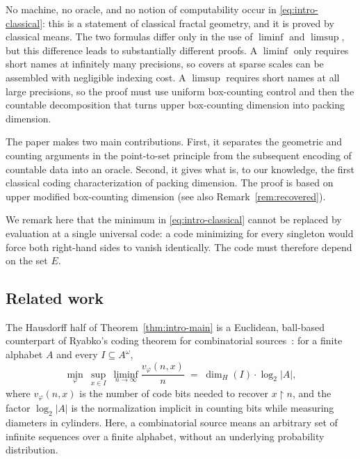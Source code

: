 \documentclass[a4paper,oneside,reqno,12pt]{amsart}
\theoremstyle{plain}
\theoremstyle{definition}
\theoremstyle{remark}
\begin{document}
No machine, no oracle, and no notion of computability occur in
\eqref{eq:intro-classical}:
this is a statement of classical fractal geometry, and
it is proved by classical means.
The two formulas differ only in the use of \(\liminf\) and \(\limsup\), but
this difference leads to substantially different proofs.
A \(\liminf\) only requires short names at infinitely many precisions,
so covers at sparse scales can be assembled with negligible indexing cost.
A \(\limsup\) requires short names at all large precisions,
so the proof must use uniform box-counting control and then the countable
decomposition that turns upper box-counting dimension into packing dimension.

The paper makes two main contributions.
First, it separates the geometric and
counting arguments in the point-to-set principle from the subsequent encoding
of countable data into an oracle.
Second, it gives what is, to our knowledge,
the first classical coding characterization of packing dimension.  The proof is
based on upper modified box-counting dimension (see also Remark~\ref{rem:recovered}).

We remark here that the minimum in
\eqref{eq:intro-classical} cannot be replaced by evaluation at a single universal code: a code minimizing for every singleton would force both right-hand sides to vanish identically.
The code must therefore depend on the set \(E\).

\subsection*{Related work}

The Hausdorff half of Theorem~\ref{thm:intro-main} is a Euclidean, ball-based
counterpart of Ryabko's coding theorem for combinatorial
sources~\cite{Ryabko1986}: for a finite alphabet \(A\) and every
\(I\subseteq A^\omega\),
\[
\min_{\varphi}\ \sup_{x\in I}\ \liminf_{n\to\infty}\frac{v_\varphi(n,x)}{n}
\;=\;
\dim_H(I)\cdot\log_2|A|,
\]
where \(v_\varphi(n,x)\) is the number of code bits needed to recover
\(x\!\upharpoonright\! n\), and the factor \(\log_2|A|\) is the normalization
implicit in counting bits while measuring diameters in cylinders.
Here, a combinatorial source means an arbitrary set of infinite sequences
over a finite alphabet, without an underlying probability distribution.
\end{document}
